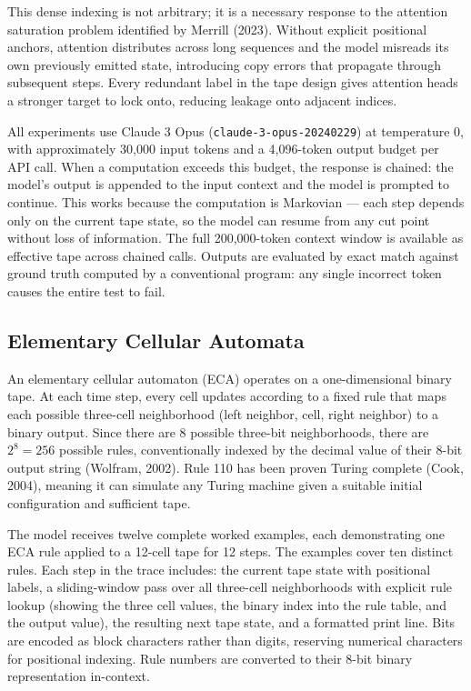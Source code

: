 \documentclass[twocolumn,switch,10pt]{article}
\begin{document}
This dense indexing is not arbitrary; it is a necessary response to the attention saturation problem identified by Merrill (2023). Without explicit positional anchors, attention distributes across long sequences and the model misreads its own previously emitted state, introducing copy errors that propagate through subsequent steps. Every redundant label in the tape design gives attention heads a stronger target to lock onto, reducing leakage onto adjacent indices.

All experiments use Claude 3 Opus (\texttt{claude-3-opus-20240229}) at temperature 0, with approximately 30,000 input tokens and a 4,096-token output budget per API call. When a computation exceeds this budget, the response is chained: the model's output is appended to the input context and the model is prompted to continue. This works because the computation is Markovian --- each step depends only on the current tape state, so the model can resume from any cut point without loss of information. The full 200,000-token context window is available as effective tape across chained calls. Outputs are evaluated by exact match against ground truth computed by a conventional program: any single incorrect token causes the entire test to fail.

\subsection{Elementary Cellular Automata}\label{sec:eca}

An elementary cellular automaton (ECA) operates on a one-dimensional binary tape. At each time step, every cell updates according to a fixed rule that maps each possible three-cell neighborhood (left neighbor, cell, right neighbor) to a binary output. Since there are 8 possible three-bit neighborhoods, there are \(2^8 = 256\) possible rules, conventionally indexed by the decimal value of their 8-bit output string (Wolfram, 2002). Rule 110 has been proven Turing complete (Cook, 2004), meaning it can simulate any Turing machine given a suitable initial configuration and sufficient tape.

The model receives twelve complete worked examples, each demonstrating one ECA rule applied to a 12-cell tape for 12 steps. The examples cover ten distinct rules. Each step in the trace includes: the current tape state with positional labels, a sliding-window pass over all three-cell neighborhoods with explicit rule lookup (showing the three cell values, the binary index into the rule table, and the output value), the resulting next tape state, and a formatted print line. Bits are encoded as block characters rather than digits, reserving numerical characters for positional indexing. Rule numbers are converted to their 8-bit binary representation in-context.
\end{document}
